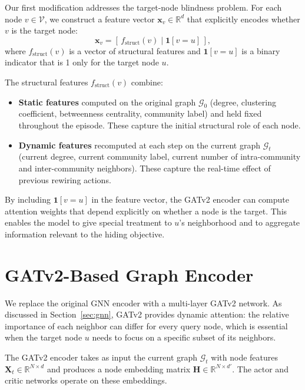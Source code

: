\documentclass[11pt,a4paper,twoside]{tesis}
\newcommand{\G}{\mathcal{G}}
\newcommand{\V}{\mathcal{V}}
\begin{document}
Our first modification addresses the target-node blindness problem. For each node $v \in
\V$, we construct a feature vector $\mathbf{x}_v \in \mathbb{R}^d$ that explicitly
encodes whether $v$ is the target node:
\[
\mathbf{x}_v = \left[\,f_{\mathrm{struct}}(v) \;\Big|\; \mathbf{1}[v = u]\,\right],
\]
where $f_{\mathrm{struct}}(v)$ is a vector of structural features and $\mathbf{1}[v=u]$
is a binary indicator that is 1 only for the target node $u$.

The structural features $f_{\mathrm{struct}}(v)$ combine:
\begin{itemize}
    \item \textbf{Static features} computed on the original graph $\G_0$ (degree,
          clustering coefficient, betweenness centrality, community label) and held
          fixed throughout the episode. These capture the initial structural role of
          each node.
    \item \textbf{Dynamic features} recomputed at each step on the current graph $\G_t$
          (current degree, current community label, current number of intra-community
          and inter-community neighbors). These capture the real-time effect of previous
          rewiring actions.
\end{itemize}

By including $\mathbf{1}[v = u]$ in the feature vector, the GATv2 encoder can compute
attention weights that depend explicitly on whether a node is the target. This enables
the model to give special treatment to $u$'s neighborhood and to aggregate information
relevant to the hiding objective.

\section{GATv2-Based Graph Encoder}
\label{sec:encoder}

We replace the original GNN encoder with a multi-layer GATv2 \cite{brody2022how}
network. As discussed in Section~\ref{sec:gnn}, GATv2 provides dynamic attention:
the relative importance of each neighbor can differ for every query node, which is
essential when the target node $u$ needs to focus on a specific subset of its neighbors.

The GATv2 encoder takes as input the current graph $\G_t$ with node features
$\mathbf{X}_t \in \mathbb{R}^{N \times d}$ and produces a node embedding matrix
$\mathbf{H} \in \mathbb{R}^{N \times d'}$. The actor and critic networks operate on
these embeddings.
\end{document}
